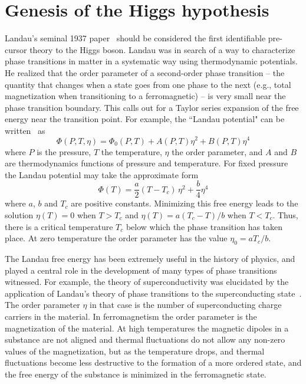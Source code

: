 \documentclass[letter,12pt]{article}
\def\beq{\begin{equation}}
\def\eeq{\end{equation}}
\begin{document}
\section{Genesis of the Higgs hypothesis}
\label{sec:genesis}

Landau's seminal 1937 paper~\cite{Landau:1937} should be considered the first identifiable pre-cursor theory to the Higgs boson.  Landau was in search of a way to characterize phase transitions in matter in a systematic way using thermodynamic potentials. He realized that the order parameter of a second-order phase transition -- the quantity that changes when a state goes from one phase to the next (e.g., total magnetization when transitioning to a ferromagnetic) -- is very small near the phase transition boundary. This calls out for a Taylor series expansion of the free energy near the transition point.  For example,  the ``Landau potential" can be written~\cite{Landau:1980} as
\beq
\label{eq:landau}
\Phi(P,T,\eta)=\Phi_0(P,T)+A(P,T)\eta^2+B(P,T)\eta^4
\eeq
where $P$ is the pressure, $T$ the temperature, $\eta$ the order parameter, and $A$ and $B$ are thermodynamics functions of pressure and temperature. For fixed pressure the Landau potential may take the approximate form
\beq
\Phi(T)=\frac{a}{2}(T-T_c)\,\eta^2+\frac{b}{4}\eta^4
\eeq
where $a$, $b$ and $T_c$ are positive constants. Minimizing this free energy leads to the solution
$\eta(T)=0$ when $T>T_c$ and $\eta(T)=a(T_c-T)/b$ when $T<T_c$. Thus, there is a critical temperature $T_c$ below which the phase transition has taken place.  At zero temperature the order parameter has the value $\eta_0=aT_c/b$.

The Landau free energy has been extremely useful in the history of physics, and played a central role in the development of many types of phase transitions witnessed. For example, the theory of superconductivity was elucidated by the application of Landau's theory of phase transitions to the superconducting state~\cite{Ginzburg:1950}.  The order parameter $\eta$ in that case is the number of superconducting charge carriers in the material.  In ferromagnetism the order parameter is the magnetization of the material.  At high temperatures the magnetic dipoles in a substance are not aligned and thermal fluctuations do not allow any non-zero values of the magnetization, but as the temperature drops, and thermal fluctuations become less destructive to the formation of a more ordered state, and the free energy of the substance is minimized in the ferromagnetic state.
\end{document}
